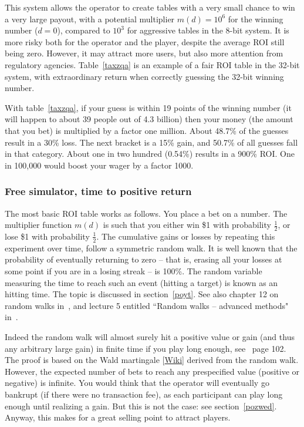\documentclass[oneside,10pt]{book}
\begin{document}
\noindent This system allows the operator to create tables with a very small chance to win a very large payout,
 with a potential multiplier $m(d)=10^6$ for the winning number ($d=0$), compared to $10^3$ for aggressive tables in the 8-bit system. It is more risky both for the operator and the player, despite the average ROI still being zero. However, it may attract more users, but also more attention from regulatory agencies. Table~\ref{taxzqa} is an example of a fair ROI table in
 the 32-bit system, with extraordinary return when correctly guessing the 32-bit winning number. 

With table~\ref{taxzqa}, if your guess is within 19 points of the winning number (it will happen to about 39 people out of 4.3 billion) then your money (the amount that you bet)  is multiplied by a factor one million. About 48.7\% of the guesses result in a 30\% loss. The next bracket is a 15\% gain, and 50.7\% of all guesses fall in that category. About one in two hundred (0.54\%) results in a 900\% ROI. One in 100,000 would boost your wager by a factor 1000. 

\subsubsection{Free simulator, time to positive return}

The most basic ROI table works as follows. You place a bet on a number.  The multiplier function $m(d)$ is such that
 you either win \$1 with probability $\frac{1}{2}$, or lose \$1 with probability $\frac{1}{2}$. The cumulative gains or losses
 by repeating this experiment over time, follow a \textcolor{index}{symmetric random walk}. It is well known that
 the probability of eventually returning to zero -- that is, erasing all your losses at some point  if you are in a losing streak -- is 100\%.
 The random variable measuring the time to reach such an event (hitting a target) is known as an \textcolor{index}{hitting time}. The topic is discussed in section~\ref{poyt}. 
See also chapter 12 on random walks in~\cite{baslmou}, and lecture 5 entitled ``Random walks -- advanced methods" in~\cite{tex19ram}.

Indeed the random walk will almost surely hit a positive value or gain (and thus any arbitrary large gain)
 in finite time if you play long enough, see~\cite{martin91} page 102. The proof is based on the 
\textcolor{index}{Wald martingale} [\href{https://en.wikipedia.org/wiki/Wald%27s_martingale}{Wiki}]  derived from the random walk. However, the expected number of bets to reach any prespecified value (positive or negative) is infinite.
You would think that the operator will eventually go bankrupt (if there were no transaction fee), as each participant can play long enough until realizing a gain. But this is not the case: see section~\ref{pozwed}. Anyway, this makes for a great selling point to attract players.
\end{document}

